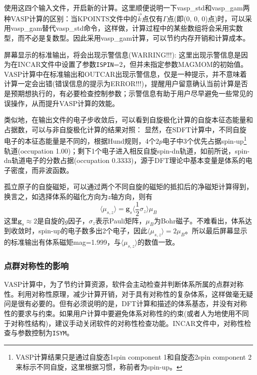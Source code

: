 使用这四个输入文件，开启新的计算。这里顺便说明一下\textrm{vasp\_std}和{vasp\_gam}两种\textrm{VASP}计算的区别：当\textrm{KPOINTS}文件中的$\vec k$点仅有$\Gamma$点(即(0, 0, 0)点)时，可以采用\textrm{vasp\_gam}替代\textrm{vasp\_std}命令，这样做，计算过程中的某些数组将会采用实数型，而不必是复数型。因此采用\textrm{vasp\_gam}计算，可以节约内存开销和计算成本。

屏幕显示的标准输出，将会出现示警信息(\textrm{WARRING!!!}):
{\fontsize{8.2pt}{6.2pt}\selectfont{
}}
这里出现示警信息是因为在\textrm{INCAR}文件中设置了参数\texttt{ISPIN}=2，但并未指定参数\textrm{MAGMOM}的初始值。\textrm{VASP}计算中在标准输出和\textrm{OUTCAR}出现示警信息，仅是一种提示，并不意味着计算一定会出错(错误信息的提示为\textrm{ERROR!!!})，提醒用户留意确认当前计算是否是预期想执行的，有必要检查控制参数；示警信息有助于用户尽早避免一些常见的误操作，从而提升\textrm{VASP}计算的效能。

类似地，在输出文件的电子步收敛后，可以看到自旋极化计算的自旋本征态能量和占据数，可以与非自旋极化计算的结果对照：
{\fontsize{8.2pt}{6.2pt}\selectfont{
}}
显然，在\textrm{SDFT}计算中，不同自旋电子的本征态能量是不同的，根据\textrm{Hund}规则，4个$2p$电子中3个优先占据\textrm{spin-up}\footnote{\textrm{VASP}计算结果只是通过自旋态1\textrm{spin component 1}和自旋态2\textrm{spin component 2}来标示不同自旋，这里根据习惯，称前者为\textrm{spin-up}。}轨道(\textrm{occupation 1.00})；剩下1个电子进入相反自旋\textrm{spin-dn}轨道，如前所说，\textrm{spin-dn}轨道电子的分数占据(\textrm{occupation 0.3333})，源于\textrm{DFT}理论中基本变量是体系的电子密度，而非波函数。

孤立原子的自旋磁矩，可以通过两个不同自旋的磁矩的抵扣后的净磁矩计算得到，换言之，如选择体系的磁化方向为$z$轴方向，则有
\begin{displaymath}
	\langle\mu_{s,z}\rangle=\mathbf{g}_s\langle\dfrac12\sigma_z\rangle\mu_B
\end{displaymath}
这里$\mathbf{g}_s\approx2$是自旋的$g$因子，$\sigma_z$表示\textrm{Pauli}矩阵，$\mu_B$为\textrm{Bohr}磁子。不难看出，体系达到收敛时，\textrm{spin-up}的电子数多出2个电子，因此$\langle\mu_{s,z}\rangle=2\mu_B$。所以最后屏幕显示的标准输出有体系磁矩\textrm{mag}=1.999，与$\langle\mu_{s,z}\rangle$的数值一致。

\subsubsection{点群对称性的影响}\label{Sec:atom-O-3}
\textrm{VASP}计算中，为了节约计算资源，软件会主动检查并判断体系所属的点群对称性。利用对称性原理，减少计算开销，对于具有对称性的复杂体系，这样做毫无疑问是很有必要的。但有必须说明的是，\textrm{DFT}计算和描述的体系基态，并没有对称性的要求与约束。如果用户计算中要避免体系对称性的约束(或者人为地使用不同于对称性结构)，建议手动关闭软件的对称性检查功能。\textrm{INCAR}文件中，对称性检查与参数控制为\texttt{ISYM}。

